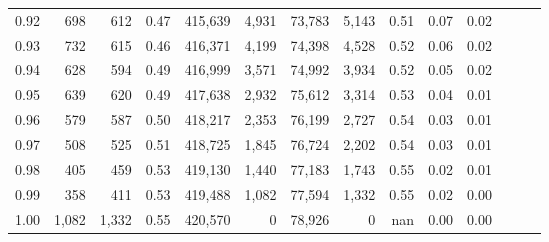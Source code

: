 \begin{tabular}{rrrrrrrrrrrrrr}
0.92 &    698 &    612 &  0.47 &  415,639 &    4,931 &  73,783 &   5,143 &  0.51 &  0.07 &      0.02 \\
0.93 &    732 &    615 &  0.46 &  416,371 &    4,199 &  74,398 &   4,528 &  0.52 &  0.06 &      0.02 \\
0.94 &    628 &    594 &  0.49 &  416,999 &    3,571 &  74,992 &   3,934 &  0.52 &  0.05 &      0.02 \\
0.95 &    639 &    620 &  0.49 &  417,638 &    2,932 &  75,612 &   3,314 &  0.53 &  0.04 &      0.01 \\
0.96 &    579 &    587 &  0.50 &  418,217 &    2,353 &  76,199 &   2,727 &  0.54 &  0.03 &      0.01 \\
0.97 &    508 &    525 &  0.51 &  418,725 &    1,845 &  76,724 &   2,202 &  0.54 &  0.03 &      0.01 \\
0.98 &    405 &    459 &  0.53 &  419,130 &    1,440 &  77,183 &   1,743 &  0.55 &  0.02 &      0.01 \\
0.99 &    358 &    411 &  0.53 &  419,488 &    1,082 &  77,594 &   1,332 &  0.55 &  0.02 &      0.00 \\
1.00 &  1,082 &  1,332 &  0.55 &  420,570 &        0 &  78,926 &       0 &   nan &  0.00 &      0.00 \\
\bottomrule
\end{tabular}
